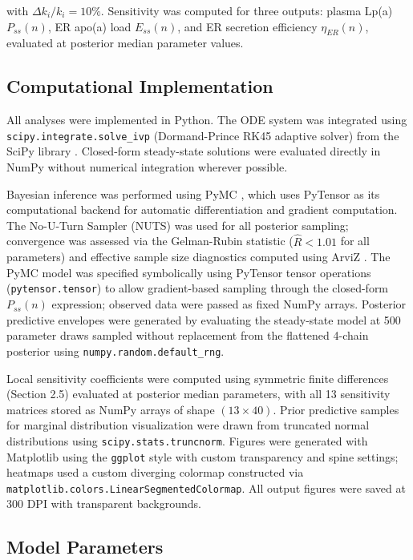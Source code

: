 \documentclass[12pt,letterpaper]{article}
\begin{document}
with $\Delta k_i / k_i = 10\%$. Sensitivity was computed for three outputs: plasma Lp(a) $P_{ss}(n)$, ER apo(a) load $E_{ss}(n)$, and ER secretion efficiency $\eta_{ER}(n)$, evaluated at posterior median parameter values.

\subsection{Computational Implementation}

All analyses were implemented in Python. The ODE system was integrated using \\ \texttt{scipy.integrate.solve\_ivp} (Dormand-Prince RK45 adaptive solver) from the SciPy library \citep{2020SciPy-NMeth}. Closed-form steady-state solutions were evaluated directly in NumPy \citep{harris2020array} without numerical integration wherever possible.

Bayesian inference was performed using PyMC \citep{pymc2023}, which uses PyTensor as its computational backend for automatic differentiation and gradient computation. The No-U-Turn Sampler (NUTS) \citep{hoffman2014no} was used for all posterior sampling; convergence was assessed via the Gelman-Rubin statistic ($\hat{R} < 1.01$ for all parameters) and effective sample size diagnostics computed using ArviZ \citep{Martin2026}. The PyMC model was specified symbolically using PyTensor tensor operations (\texttt{pytensor.tensor}) to allow gradient-based sampling through the closed-form $P_{ss}(n)$ expression; observed data were passed as fixed NumPy arrays. Posterior predictive envelopes were generated by evaluating the steady-state model at 500 parameter draws sampled without replacement from the flattened 4-chain posterior using \texttt{numpy.random.default\_rng}.

Local sensitivity coefficients were computed using symmetric finite differences (Section 2.5) evaluated at posterior median parameters, with all 13 sensitivity matrices stored as NumPy arrays of shape $(13 \times 40)$. Prior predictive samples for marginal distribution visualization were drawn from truncated normal distributions using \texttt{scipy.stats.truncnorm}. Figures were generated with Matplotlib \citep{Hunter:2007} using the \texttt{ggplot} style with custom transparency and spine settings; heatmaps used a custom diverging colormap constructed via \texttt{matplotlib.colors.LinearSegmentedColormap}. All output figures were saved at 300 DPI with transparent backgrounds.

\subsection{Model Parameters}
\end{document}
